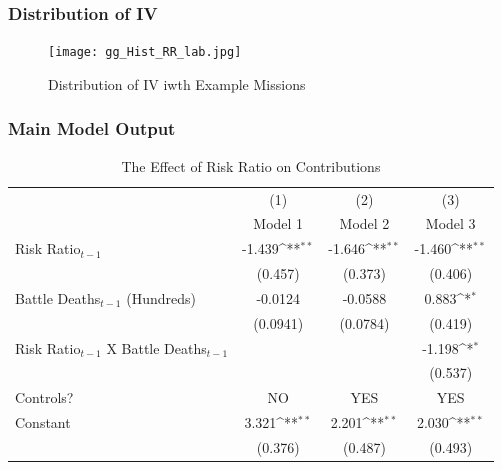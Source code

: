 \documentclass{beamer}
\begin{document}

\begin{frame}
\frametitle{Distribution of IV}

\begin{figure}[t]
\centering
\texttt{[image: gg\_Hist\_RR\_lab.jpg]}
\caption{\scriptsize Distribution of IV iwth Example Missions}
\label{H1}
\end{figure}

\end{frame}


\begin{frame}[fragile]
\frametitle{Main Model Output}

\begin{table}[htbp]\centering
\tiny
\def\sym#1{\ifmmode^{#1}\else\(^{#1}\)\fi}
\caption{The Effect of Risk Ratio on Contributions \label{Table 2}}
\vspace{0.4cm}
\begin{tabular}{l*{3}{c}}
\hline\hline
                    &\multicolumn{1}{c}{(1)}        &\multicolumn{1}{c}{(2)}        &\multicolumn{1}{c}{(3)}        \\
                    &          Model 1        &          Model 2        &          Model 3        \\
\hline
Risk Ratio$_{t-1}$          &      -1.439\sym{**}&      -1.646\sym{**}&      -1.460\sym{**}\\
                    &     (0.457)        &     (0.373)        &     (0.406)        \\
[1em]
Battle Deaths$_{t-1}$ (Hundreds)&     -0.0124        &     -0.0588        &       0.883\sym{*} \\
                    &    (0.0941)        &    (0.0784)        &     (0.419)        \\
[1em]
Risk Ratio$_{t-1}$ X Battle Deaths$_{t-1}$&                    &                    &      -1.198\sym{*} \\
                    &                    &                    &     (0.537)        \\
[1em]
Controls?           &       NO          &        YES         &         YES        \\
[1em]
Constant            &       3.321\sym{**}&       2.201\sym{**}&       2.030\sym{**}\\
                    &     (0.376)        &     (0.487)        &     (0.493)        \\

\end{tabular}
\end{table}
\end{frame}
\end{document}
